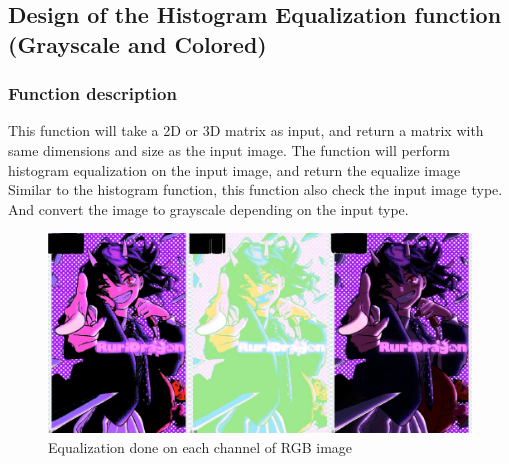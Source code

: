 \documentclass[a4paper,11pt]{article}
\begin{document}
\subsection{Design of the Histogram Equalization function (Grayscale and Colored)}
\subsubsection{Function description}
This function will take a 2D or 3D matrix as input, and return a matrix with same dimensions and size as the input image. The function will perform histogram equalization on the input image, and return the equalize image\\

Similar to the histogram function, this function also check the input image type. And convert the image to grayscale depending on the input type.\\

\begin{figure}[H]
    \centering
    \includegraphics[width=0.8\linewidth]{Demo3-InccoorectlyEqualized.jpg}
    \caption{Equalization done on each channel of RGB image}
    \label{pic:Mistake1}
\end{figure}
\end{document}

